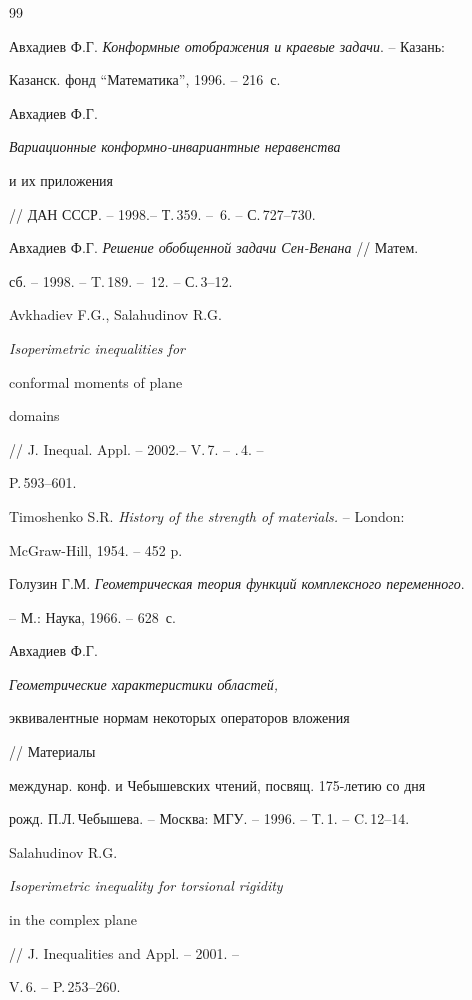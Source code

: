 {\begin{thebibliography}{99}


Авхадиев Ф.Г.  {\em Конформные отображения и краевые задачи}. -- Казань:


Казанск. фонд ``Математика'', 1996. -- 216~с.




Авхадиев Ф.Г.  {\em Вариационные конформно-инвариантные неравенства 


и их приложения}


// ДАН СССР. -- 1998.-- Т.\,359. -- \No\,6. -- С.\,727--730.




Авхадиев Ф.Г.  {\em Решение обобщенной задачи Сен-Венана} // Матем.


сб. -- 1998. -- T.\,189. -- \No\,12. -- С.\,3--12.




Avkhadiev F.G., Salahudinov R.G.  {\em Isoperimetric inequalities for 


conformal moments of plane


domains} // J. Inequal. Appl. -- 2002.-- V.\,7. -- \No.\,4. --


P.\,593--601.




Timoshenko S.R. {\em History of the strength of materials.} -- London:


McGraw-Hill, 1954. -- 452 p.




Голузин Г.М.  {\em Геометрическая теория функций комплексного переменного}.


-- М.: Наука, 1966. -- 628~с.




Авхадиев Ф.Г.  {\em Геометрические характеристики областей, 


эквивалентные нормам некоторых операторов вложения} // Материалы 


междунар. конф. и Чебышевских чтений, посвящ. 175-летию со дня 


рожд. П.Л.\,Чебышева. -- Москва: МГУ. -- 1996. -- Т.\,1. -- C.\,12--14.




Salahudinov R.G.  {\em Isoperimetric inequality for torsional rigidity 


in the complex plane} // J. Inequalities and Appl. -- 2001. --


V.\,6. -- P.\,253--260.





\end{thebibliography}}
